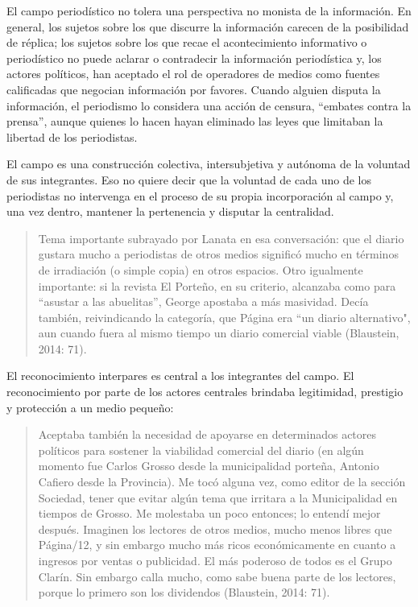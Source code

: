 El campo periodístico no tolera una perspectiva no monista de la información. En general, los sujetos sobre los que discurre la información carecen de la posibilidad de réplica; los sujetos sobre los que recae el acontecimiento informativo o periodístico no puede aclarar o contradecir la información periodística y, los actores políticos, han aceptado el rol de operadores de medios como fuentes calificadas que negocian información por favores. Cuando alguien disputa la información, el periodismo lo considera una acción de censura, \enquote{embates contra la prensa}, aunque quienes lo hacen hayan eliminado las leyes que limitaban la libertad de los periodistas.

El campo es una construcción colectiva, intersubjetiva y autónoma de la voluntad de sus integrantes. Eso no quiere decir que la voluntad de cada uno de los periodistas no intervenga en el proceso de su propia incorporación al campo y, una vez dentro, mantener la pertenencia y disputar la centralidad.

\begin{quote}
Tema importante subrayado por Lanata en esa conversación: que el diario gustara mucho a periodistas de otros medios significó mucho en términos de irradiación (o simple copia) en otros espacios. Otro igualmente importante: si la revista El Porteño, en su criterio, alcanzaba como para ``asustar a las abuelitas'', George apostaba a más masividad. Decía también, reivindicando la categoría, que Página era ``un diario alternativo", aun cuando fuera al mismo tiempo un diario comercial viable (Blaustein, 2014: 71).
\end{quote}

El reconocimiento interpares es central a los integrantes del campo. El reconocimiento por parte de los actores centrales brindaba legitimidad, prestigio y protección a un medio pequeño:

\begin{quote}
Aceptaba también la necesidad de apoyarse en determinados actores políticos para sostener la viabilidad comercial del diario (en algún momento fue Carlos Grosso desde la municipalidad porteña, Antonio Cafiero desde la Provincia). Me tocó alguna vez, como editor de la sección Sociedad, tener que evitar algún tema que irritara a la Municipalidad en tiempos de Grosso. Me molestaba un poco entonces; lo entendí mejor después. Imaginen los lectores de otros medios, mucho menos libres que Página/12, y sin embargo mucho más ricos económicamente en cuanto a ingresos por ventas o publicidad. El más poderoso de todos es el Grupo Clarín. Sin embargo calla mucho, como sabe buena parte de los lectores, porque lo primero son los dividendos (Blaustein, 2014: 71).
\end{quote}

